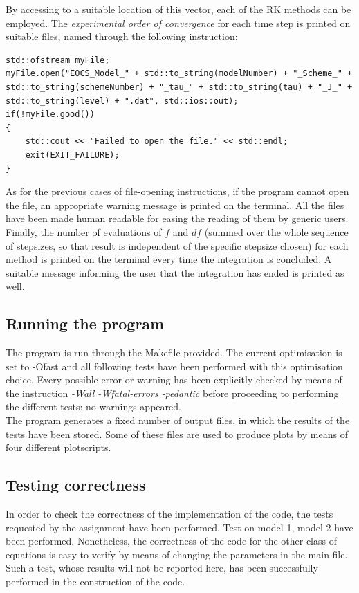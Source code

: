 \documentclass[11pt]{article}
\theoremstyle{theorem}
\theoremstyle{definition}
\begin{document}
By accessing to a suitable location of this vector, each of the RK methods can be employed. The \emph{experimental order of convergence} for each time step is printed on suitable files, named through the following instruction:

\begin{lstlisting}
std::ofstream myFile;
myFile.open("EOCS_Model_" + std::to_string(modelNumber) + "_Scheme_" + std::to_string(schemeNumber) + "_tau_" + std::to_string(tau) + "_J_" + std::to_string(level) + ".dat", std::ios::out);
if(!myFile.good())
{
	std::cout << "Failed to open the file." << std::endl;
	exit(EXIT_FAILURE);
}
\end{lstlisting}

As for the previous cases of file-opening instructions, if the program cannot open the file, an appropriate warning message is printed on the terminal. All the files have been made human readable for easing the reading of them by generic users.\\
Finally, the number of evaluations of $f$ and $df$ (summed over the whole sequence of stepsizes, so that result is independent of the specific stepsize chosen) for each method is printed on the terminal every time the integration is concluded. A suitable message informing the user that the integration has ended is printed as well.\\

\subsection{Running the program}
The program is run through the Makefile provided. The current optimisation is set to -Ofast and all following tests have been performed with this optimisation choice. Every possible error or warning has been explicitly checked by means of the instruction \emph{-Wall -Wfatal-errors -pedantic} before proceeding to performing the different tests: no warnings appeared.\\
The program generates a fixed number of output files, in which the results of the tests have been stored. Some of these files are used to produce plots by means of four different plotscripts.\\ 

\subsection{Testing correctness}
In order to check the correctness of the implementation of the code, the tests requested by the assignment have been performed. Test on model 1, model 2 have been performed. Nonetheless, the correctness of the code for the other class of equations is easy to verify by means of changing the parameters in the main file. Such a test, whose results will not be reported here, has been successfully performed in the construction of the code.\\
\end{document}
